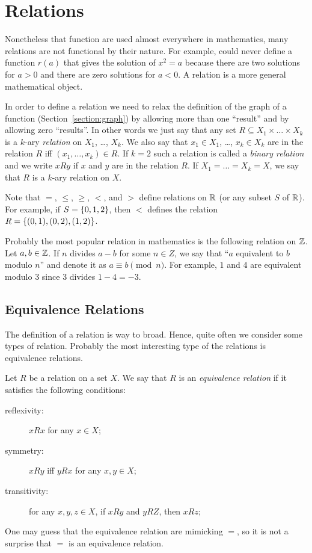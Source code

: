 \chapter{Relations}
\label{chapter:relations}
Nonetheless that function are used almost everywhere in mathematics, many
relations are not functional by their nature. For example, could never define a
function $r(a)$ that gives the solution of $x^2 = a$ because there are two
solutions for $a > 0$ and there are zero solutions for $a < 0$. A relation is a
more general mathematical object.

In order to define a relation we need to relax the definition of the graph of a
function (Section~\ref{section:graph}) by allowing more than one ``result'' and
by allowing zero ``results''. In other words we just say that any set $R
\subseteq X_1 \times \dots \times X_k$ is a $k$-ary \emph{relation} on $X_1$,
\dots, $X_k$. We also say that $x_1 \in X_1$, \dots, $x_k \in X_k$ are in the
relation $R$ iff $(x_1, \dots, x_k) \in R$. If $k = 2$ such a relation is
called a \emph{binary relation} and we write $x R y$ if $x$ and $y$ are in
the relation $R$. If $X_1 = \dots = X_k = X$, we say that $R$ is a $k$-ary
relation on $X$.

Note that $=$, $\le$, $\ge$, $<$, and $>$ define relations on $\mathbb{R}$ (or any
subset $S$ of $\mathbb{R}$). For example, if $S = \set{0, 1, 2}$, then $<$ defines
the relation $R = \set{(0, 1), (0, 2), (1, 2)}$.

Probably the most popular relation in mathematics is the following relation on
$\mathbb{Z}$. Let $a, b \in \mathbb{Z}$. If $n$ divides $a - b$ for some $n \in Z$, we say that
``$a$ equivalent to $b$ modulo $n$'' and denote it as $a \equiv b \pmod{n}$.
For example, $1$ and $4$ are equivalent modulo $3$ since $3$ divides
$1 - 4 = -3$.

\section{Equivalence Relations}
The definition of a relation is way to broad. Hence, quite often we consider
some types of relation. Probably the most interesting type of the relations is
equivalence relations.

\begin{definition}
  Let $R$ be a relation on a set $X$. We say that $R$ is an \emph{equivalence
  relation} if it satisfies the following conditions:
  \begin{description}
    \item[reflexivity:]  $x R x$ for any $x \in X$;
    \item[symmetry:]  $x R y$ iff $y R x$ for any $x, y \in X$;
    \item[transitivity:]  for any $x, y, z \in X$, if $x R y$ and $y R Z$, then
      $x R z$;
  \end{description}
\end{definition}
One may guess that the equivalence relation are mimicking $=$, so it is not a
surprise that $=$ is an equivalence relation.

